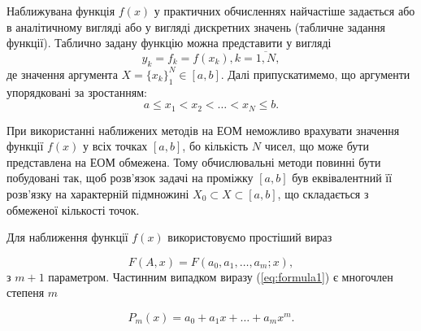 \documentclass[ukrainian,14pt]{extarticle}
\begin{document}
%

Наближувана функція $f(x)$ у практичних обчисленнях найчастіше задається або в аналітичному вигляді або у вигляді дискретних значень (табличне задання функції). Таблично задану функцію можна представити у вигляді
$$y_k = f_k = f(x_k), k =\overline{1,N},$$
де значення аргумента $X=\{x_k\}_1^N \in [a, b]$. Далі припускатимемо, що аргументи упорядковані за зростанням:
$$a \leq x_1 < x_2 < \ldots < x_N \leq b.$$



При використанні наближених методів на ЕОМ неможливо врахувати значення функції $f(x)$ у всіх точках $[a,b]$, бо кількість $N$ 
чисел, що може бути представлена на ЕОМ обмежена. Тому обчислювальні методи повинні бути побудовані так, щоб розв'язок
задачі на проміжку $[a,b]$ був еквівалентний її розв'язку на характерній підмножині $X_0 \subset X \subset [a,b]$, що складається з обмеженої кількості точок.

Для наближення функції $f(x)$ використовуємо простіший вираз

\begin{equation}\label{eq:formula1}
F(A,x) = F(a_0, a_1,\ldots, a_m; x),
\end{equation}з $m+1$ параметром. Частинним випадком виразу (\ref{eq:formula1}) є многочлен степеня $m$

\begin{equation}\label{eq:formula2}
P_m(x) = a_0 + a_1x + \ldots + a_mx^m.
\end{equation}
\end{document}
